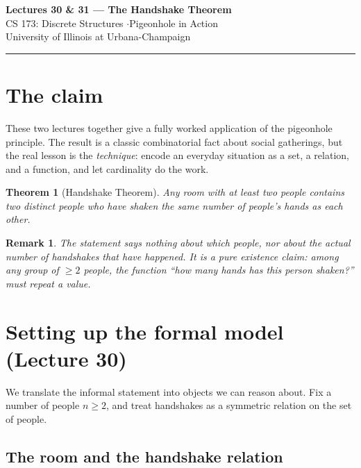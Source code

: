 \documentclass[11pt]{article}
\theoremstyle{defstyle}
\theoremstyle{thmstyle}
\newtheorem{theorem}{Theorem}[section]
\theoremstyle{notstyle}
\newtheorem*{remark}{Remark}
\theoremstyle{cautionstyle}
\begin{document}
\begin{center}
  {\Large\bfseries Lectures 30 \& 31 --- The Handshake Theorem}\\[4pt]
  {\normalsize CS 173: Discrete Structures \quad$\cdot$\quad Pigeonhole in Action}\\[2pt]
  {\small\color{gray} University of Illinois at Urbana-Champaign}
\end{center}
\vspace{1em}\hrule\vspace{1.5em}

\section{The claim}

These two lectures together give a fully worked application of the
pigeonhole principle. The result is a classic combinatorial fact about
social gatherings, but the real lesson is the \emph{technique}: encode
an everyday situation as a set, a relation, and a function, and let
cardinality do the work.

\begin{thmbox}
\begin{theorem}[Handshake Theorem]
Any room with at least two people contains two distinct people who have
shaken the same number of people's hands as each other.
\end{theorem}
\end{thmbox}

\begin{notebox}
\begin{remark}
The statement says nothing about which people, nor about the actual number
of handshakes that have happened. It is a pure existence claim: among any
group of $\geq 2$ people, the function ``how many hands has this person
shaken?'' must repeat a value.
\end{remark}
\end{notebox}

\section{Setting up the formal model (Lecture 30)}

We translate the informal statement into objects we can reason about.
Fix a number of people $n \geq 2$, and treat handshakes as a symmetric
relation on the set of people.

\subsection*{The room and the handshake relation}
\end{document}
